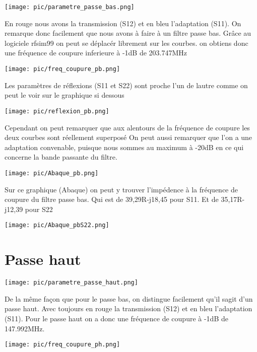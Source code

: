 \documentclass[a4paper,12pt]{report}            %
\begin{document}
\begin{center}\texttt{[image: pic/parametre\_passe\_bas.png]}\\ \end{center}
En rouge nous avons la transmission (S12) et en bleu l'adaptation (S11). On remarque donc facilement que nous avons
à faire à un filtre passe bas. Grâce au logiciele rfsim99 on peut se déplacér librement sur les courbes.
on obtiens donc une fréquence de coupure inferieure à -1dB de 203.747MHz
\begin{center}\texttt{[image: pic/freq\_coupure\_pb.png]}\\ \end{center}
Les paramètres de réflexions (S11 et S22) sont proche l'un de lautre comme on peut le voir sur le
graphique si dessous
\begin{center}\texttt{[image: pic/reflexion\_pb.png]}\\ \end{center}
Cependant on peut remarquer que aux alentours de la fréquence de coupure les deux courbes sont réellement superposé
On peut aussi remarquer que l'on a une adaptation convenable, puisque nous sommes au maximum à -20dB en
ce qui concerne la bande passante du filtre.
\begin{center}\texttt{[image: pic/Abaque\_pb.png]}\\ \end{center}
Sur ce graphique (Abaque) on peut y trouver l'impédence à la fréquence de coupure du filtre passe bas.
Qui est de 39,29R-j18,45 pour S11. Et de 35,17R-j12,39 pour S22
\begin{center}\texttt{[image: pic/Abaque\_pbS22.png]}\\ \end{center}


\section{Passe haut}

\begin{center}\texttt{[image: pic/parametre\_passe\_haut.png]}\\ \end{center}
De la même façon que pour le passe bas, on distingue facilement qu'il sagit d'un passe haut.
Avec toujours en rouge la transmission (S12) et en bleu l'adaptation (S11). Pour le passe haut 
on a donc une fréquence de coupure à -1dB de 147.992MHz.
\begin{center}\texttt{[image: pic/freq\_coupure\_ph.png]}\\ \end{center}
\end{document}
